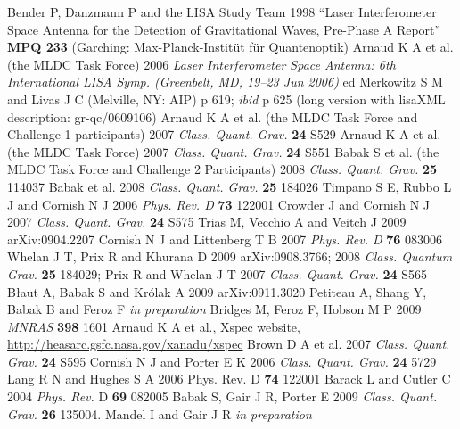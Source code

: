 \documentclass{iopart}
\begin{document}
\begin{thebibliography}{99}
%
 Bender P, Danzmann P and the LISA Study Team 1998 ``Laser Interferometer Space Antenna for the Detection of Gravitational Waves, Pre-Phase A Report'' \textbf{MPQ 233} (Garching: Max-Planck-Instit\"ut f\"ur Quantenoptik) 
%
 Arnaud K A et al. (the MLDC Task Force) 2006 \textit{Laser Interferometer Space Antenna: 6th International LISA Symp. (Greenbelt, MD, 19--23 Jun 2006)} ed Merkowitz S M and Livas J C (Melville, NY: AIP) p 619; \textit{ibid} p 625 (long version with lisaXML description: gr-qc/0609106)
%
 Arnaud K A et al. (the MLDC Task Force and Challenge 1 participants) 2007 \textit{Class. Quant. Grav.} \textbf{24} S529
%
 Arnaud K A et al. (the MLDC Task Force) 2007 \textit{Class. Quant. Grav.} \textbf{24} S551
%
 Babak S et al. (the MLDC Task Force and Challenge 2 Participants) 2008 \textit{Class. Quant. Grav.} \textbf{25} 114037
%
 Babak et al. 2008 \textit{Class. Quant. Grav.} \textbf{25} 184026
%
 Timpano S E, Rubbo L J and Cornish N J 2006 \textit{Phys. Rev. D} \textbf{73} 122001
%
 Crowder J and Cornish N J 2007 \textit{Class. Quant. Grav.}  \textbf{24} S575
%
 Trias M, Vecchio A and Veitch J 2009 arXiv:0904.2207 
%
 Cornish N J and Littenberg T B 2007 \textit{Phys. Rev. D} \textbf{76} 083006
%
 Whelan J T, Prix R and Khurana D 2009 arXiv:0908.3766;
2008 \textit{Class. Quantum Grav.} \textbf{25} 184029;
Prix R and Whelan J T 2007 \textit{Class. Quant. Grav.} \textbf{24} S565 
%
 B{\l}aut A, Babak S and Kr{\'o}lak A 2009 arXiv:0911.3020
%
 Petiteau A, Shang Y, Babak B and Feroz F \textit{in preparation}
%
 Bridges M, Feroz F, Hobson M P 2009 \textit{MNRAS} \textbf{398} 1601
%
 Arnaud K A et al., Xspec website, \url{http://heasarc.gsfc.nasa.gov/xanadu/xspec}
%
 Brown D A et al. 2007 \textit{Class. Quant. Grav.} \textbf{24} S595  
%
 Cornish N J and Porter E K 2006 \textit{Class. Quant. Grav.} \textbf{24} 5729
%
 Lang R N and Hughes S A 2006 Phys. Rev. D \textbf{74} 122001
%
 Barack L and Cutler C 2004 \textit{Phys. Rev.} D \textbf{69} 082005
%
 Babak S, Gair J R, Porter E 2009 \textit{Class. Quant. Grav.} \textbf{26} 135004.
%
 Mandel I and Gair J R \textit{in preparation}

\end{thebibliography}
\end{document}
